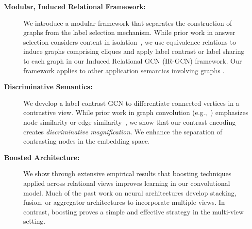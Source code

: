 \begin{description}
  \item[\textbf{Modular, Induced Relational Framework:}] We introduce a modular framework that separates the construction of graphs from the label selection mechanism. While prior work in answer selection considers content in isolation~\cite{BurelMA16,JendersKN16}, we use equivalence relations to induce graphs comprising cliques and apply label contrast or label sharing to each graph in our Induced Relational GCN (IR-GCN) framework. Our framework applies to other application semantics involving graphs \cite{InducedGraph}.
  \item[\textbf{Discriminative Semantics:}] We develop a label contrast GCN to differentiate connected vertices in a contrastive view. While prior work in graph convolution (e.g.,~\cite{gcn,DualGCN}) emphasizes node similarity or edge similarity~\cite{signedgcn}, we show that our contrast encoding creates \textit{discriminative magnification}. We enhance the separation of contrasting nodes in the embedding space.
  \item[\textbf{Boosted Architecture:}]  We show through extensive empirical results that boosting techniques applied across relational views improves learning in our convolutional model. Much of the past work on neural architectures develop stacking, fusion, or aggregator architectures to incorporate multiple views. In contrast, boosting proves a simple and effective strategy in the multi-view setting.
\end{description}


